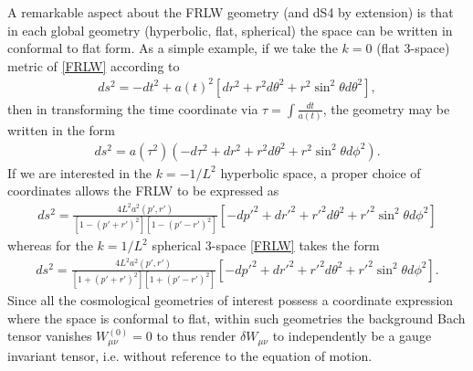 \documentclass[10pt,letterpaper]{article}
\numberwithin{equation}{section}
\begin{document}
\indent A remarkable aspect about the FRLW geometry (and dS4 by extension) is that in each global geometry (hyperbolic, flat, spherical) the space can be written in conformal to flat form. As a simple example, if we take the $k=0$ (flat 3-space) metric of \eqref{FRLW} according to
\begin{eqnarray}
ds^2 = -dt^2 + a(t)^2\left[ dr^2 + r^2d\theta^2 + r^2\sin^2\theta d\theta^2\right],
\end{eqnarray}
then in transforming the time coordinate via $\tau = \int \frac{dt}{a(t)}$, the geometry may be written in the form
\begin{eqnarray}
ds^2 = a(\tau^2)( -d\tau^2 + dr^2 + r^2d\theta^2 + r^2\sin^2\theta d\phi^2). 
\end{eqnarray}
If we are interested in the $k=-1/L^2$ hyperbolic space, a proper choice of coordinates \cite{Mannheim2012a} allows the FRLW to be expressed as
\begin{eqnarray}
ds^2=\frac{4L^2 a^2(p',r')}{[1-(p'+r')^2][1-(p'-r')^2]} \left[ -dp'^2 + dr'^2+r'^2 d\theta^2 + r'^2 \sin^2\theta d\phi^2\right]
\end{eqnarray}
whereas for the $k=1/L^2$ spherical 3-space \eqref{FRLW} takes the form
\begin{eqnarray}
ds^2=\frac{4L^2 a^2(p',r')}{[1+(p'+r')^2][1+(p'-r')^2]} \left[ -dp'^2 + dr'^2+r'^2 d\theta^2 + r'^2 \sin^2\theta d\phi^2\right].
\end{eqnarray}
Since all the cosmological geometries of interest possess a coordinate expression where the space is conformal to flat, within such geometries the background Bach tensor vanishes $W^{(0)}_{\mu\nu} = 0$ to thus render $\delta W_{\mu\nu}$ to independently be a gauge invariant tensor, i.e. without reference to the equation of motion. 
%
\end{document}
